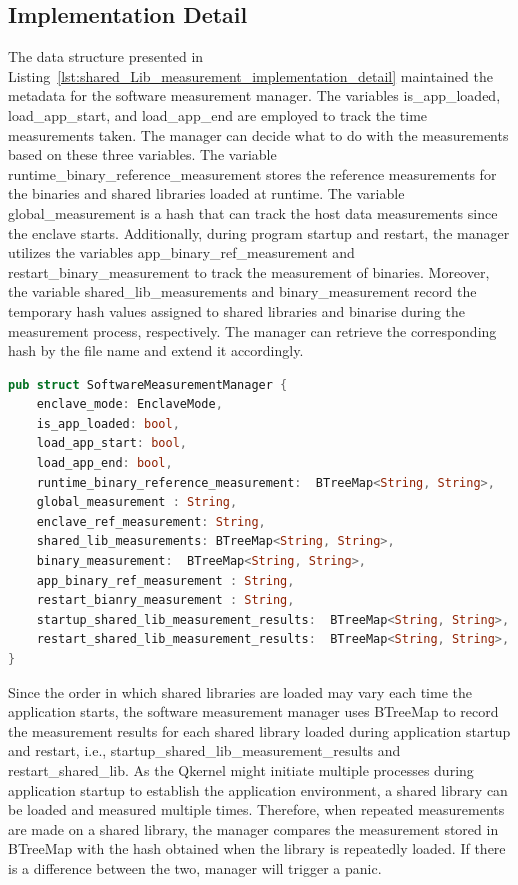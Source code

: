 \subsection{Implementation Detail}
The data structure presented in Listing~\ref{lst:shared_Lib_measurement_implementation_detail} maintained the metadata for the software measurement manager. The variables is\_app\_loaded, load\_app\_start, and load\_app\_end are employed to track the time measurements taken. The manager can decide 
what to do with the measurements based on these three variables. The variable runtime\_binary\_reference\_measurement stores the reference measurements for the binaries and shared libraries loaded at runtime. The variable global\_measurement is a hash that can track the host data measurements since 
the enclave starts. Additionally, during program startup and restart, the manager utilizes the variables app\_binary\_ref\_measurement and restart\_binary\_measurement to track the measurement of binaries. 
Moreover, the variable shared\_lib\_measurements and binary\_measurement record the temporary hash values assigned to shared libraries and binarise during the measurement process, respectively. The  manager can retrieve the corresponding hash by the file name and extend it accordingly.


\begin{lstlisting}[language=rust, caption= Interface for accessing the file type secrets, label={lst:shared_Lib_measurement_implementation_detail}]
pub struct SoftwareMeasurementManager {
    enclave_mode: EnclaveMode,
    is_app_loaded: bool,
    load_app_start: bool,
    load_app_end: bool,
    runtime_binary_reference_measurement:  BTreeMap<String, String>,
    global_measurement : String,
    enclave_ref_measurement: String,
    shared_lib_measurements: BTreeMap<String, String>,
    binary_measurement:  BTreeMap<String, String>,
    app_binary_ref_measurement : String,
    restart_bianry_measurement : String,
    startup_shared_lib_measurement_results:  BTreeMap<String, String>,
    restart_shared_lib_measurement_results:  BTreeMap<String, String>,
}
\end{lstlisting}

Since the order in which shared libraries are loaded may vary each time the application starts, the software measurement manager uses BTreeMap to record the measurement results for each shared library loaded during application startup and restart, i.e., startup\_shared\_lib\_measurement\_results 
and restart\_shared\_lib. As the Qkernel might initiate multiple processes during application startup to establish the application environment, a shared library can be loaded and measured multiple times. Therefore, when repeated measurements are made on a shared library, the manager compares 
the measurement stored in BTreeMap with the hash obtained when the library is repeatedly loaded. If there is a difference between the two, manager will trigger a panic.


